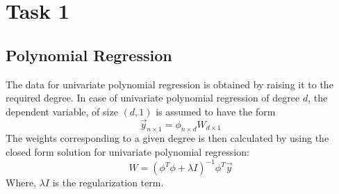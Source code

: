 \documentclass[12pt,a4paper]{article}
\newcommand{\noi}{\noindent}
\begin{document}
\section{Task 1}
\subsection{Polynomial Regression}
The data for univariate polynomial regression is obtained by raising it to the required degree. In case of univariate polynomial regression of degree $d$, the dependent variable, of size $(d,1)$ is assumed to have the form
\begin{equation}
    \vec{y}_{n\times1} = \mathit{\phi}_{n\times d}W_{d\times1}
\end{equation}
\noi
The weights corresponding to a given degree is then calculated by using the closed form solution for univariate polynomial regression:
\begin{equation}
    W = (\mathit{\phi}^T\mathit{\phi} + \lambda \mathit{I})^{-1}\mathit{\phi}^T\vec{y}
\end{equation}
Where, $\lambda\mathit{I}$ is the regularization term.
\end{document}
